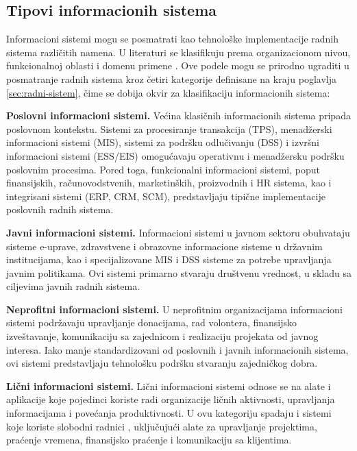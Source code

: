 \subsection{Tipovi informacionih sistema}
Informacioni sistemi mogu se posmatrati kao tehnološke implementacije radnih sistema različitih namena. U literaturi se klasifikuju prema organizacionom nivou, funkcionalnoj oblasti i domenu primene \cite{laudon2004management, bourgeois2019information}. Ove podele mogu se prirodno ugraditi u posmatranje radnih sistema kroz četiri kategorije definisane na kraju poglavlja \ref{sec:radni-sistem}, čime se dobija okvir za klasifikaciju informacionih sistema:

\begin{description}
\item \textbf{Poslovni informacioni sistemi.} Većina klasičnih informacionih sistema pripada poslovnom kontekstu. Sistemi za procesiranje transakcija (TPS), menadžerski informacioni sistemi (MIS), sistemi za podršku odlučivanju (DSS) i izvršni informacioni sistemi (ESS/EIS) omogućavaju operativnu i menadžersku podršku poslovnim procesima. Pored toga, funkcionalni informacioni sistemi, poput finansijskih, računovodstvenih, marketinških, proizvodnih i HR sistema, kao i integrisani sistemi (ERP, CRM, SCM), predstavljaju tipične implementacije poslovnih radnih sistema.
\item \textbf{Javni informacioni sistemi.} Informacioni sistemi u javnom sektoru obuhvataju sisteme e-uprave, zdravstvene i obrazovne informacione sisteme u državnim institucijama, kao i specijalizovane MIS i DSS sisteme za potrebe upravljanja javnim politikama. Ovi sistemi primarno stvaraju društvenu vrednost, u skladu sa ciljevima javnih radnih sistema.
\item \textbf{Neprofitni informacioni sistemi.} U neprofitnim organizacijama informacioni sistemi podržavaju upravljanje donacijama, rad volontera, finansijsko izveštavanje, komunikaciju sa zajednicom i realizaciju projekata od javnog interesa. Iako manje standardizovani od poslovnih i javnih informacionih sistema, ovi sistemi predstavljaju tehnološku podršku stvaranju zajedničkog dobra.
\item \textbf{Lični informacioni sistemi.} Lični informacioni sistemi odnose se na alate i aplikacije koje pojedinci koriste radi organizacije ličnih aktivnosti, upravljanja informacijama i povećanja produktivnosti. U ovu kategoriju spadaju i sistemi koje koriste slobodni radnici , uključujući alate za upravljanje projektima, praćenje vremena, finansijsko praćenje i komunikaciju sa klijentima.
\end{description}

